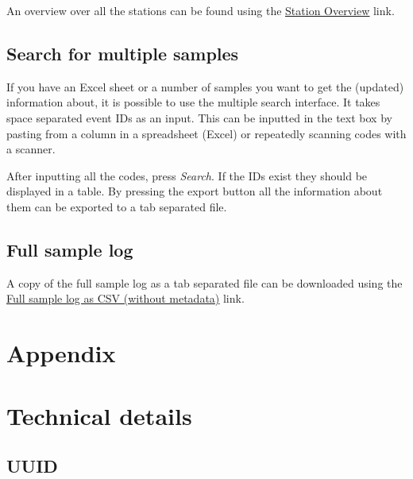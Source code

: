 \documentclass[a4paper,english, 11pt]{article}
\begin{document}
An overview over all the stations can be found using the \href{https://www.sios-svalbard.org/reports/aen_plot_all_stations}{\color{blue}\underline{Station Overview}} link.



\subsection{Search for multiple samples} %
\label{sub:search_multi}
If you have an Excel sheet or a number of samples you want to get the (updated) information about, it is possible to use the multiple search interface. It takes space separated event IDs as an input. This can be inputted in the text box by pasting from a column in a spreadsheet (Excel) or repeatedly scanning codes with a scanner. 

After inputting all the codes, press \emph{Search}. If the IDs exist they should be displayed in a table. By pressing the export button all the information about them can be exported to a tab separated file.

\subsection{Full sample log} %
\label{sub:Full sample log}
A copy of the full sample log as a tab separated file can be downloaded using the \href{https://www.sios-svalbard.org/cgi-bin/export_search.cgi?&startdate=2018-01-01&enddate=3000-01-01&geartype=&sampletype=&cruisenumber=&parenteventid=&startlat=&startlon=&endlat=&endlon=&stationname=}{\color{blue}\underline{Full sample log as CSV (without metadata)}} link.





\clearpage
\newpage
\appendix
\section*{Appendix}

\section{Technical details} %
\label{sec:Technical details}

\subsection{UUID} %
\label{sub:UUID}
\end{document}
